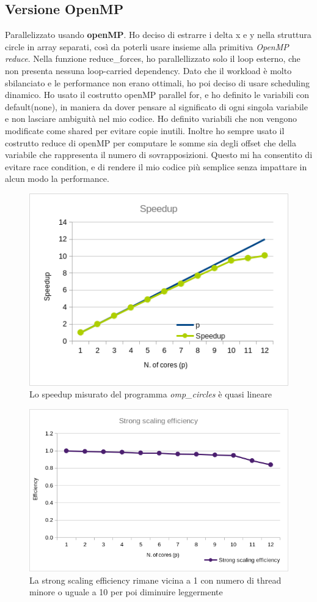\documentclass[a4paper,11pt, twoside]{report}
\begin{document}
\subsection*{Versione OpenMP}
Parallelizzato usando \textbf{openMP}.
Ho deciso di estrarre i delta x e y nella struttura circle in array separati, così da poterli usare insieme alla primitiva \textit{OpenMP reduce}.
Nella funzione reduce\_forces, ho parallellizzato solo il loop esterno, che non presenta nessuna loop-carried dependency.
Dato che il workload è molto sbilanciato e le performance non erano ottimali, ho poi deciso di usare scheduling dinamico.
Ho usato il costrutto openMP parallel for, e ho definito le variabili con default(none), in maniera da dover pensare al significato di ogni singola variabile e non lasciare ambiguità nel mio codice.
Ho definito variabili che non vengono modificate come shared per evitare copie inutili.
Inoltre ho sempre usato il costrutto reduce di openMP per computare le somme sia degli offset che della variabile che rappresenta il numero di sovrapposizioni.
Questo mi ha consentito di evitare race condition, e di rendere il mio codice più semplice senza impattare in alcun modo la performance.
\begin{figure}
    \includegraphics[scale=0.5]{images/omp_speedup.png}
    \caption[]{Lo speedup misurato del programma \textit{omp\_circles} è quasi lineare}
\end{figure}
\begin{figure}
    \includegraphics[scale=0.5]{images/omp_strong.png}
    \caption[]{La strong scaling efficiency rimane vicina a 1 con numero di thread minore o uguale a 10 per poi diminuire leggermente}
\end{figure}
\end{document}
